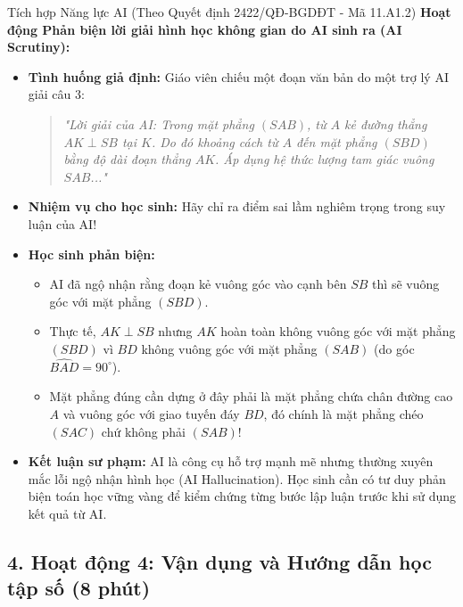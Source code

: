 \documentclass[12pt, a4paper]{article}
\begin{document}
\begin{aibox}{Tích hợp Năng lực AI (Theo Quyết định 2422/QĐ-BGDĐT - Mã 11.A1.2)}
    \textbf{Hoạt động Phản biện lời giải hình học không gian do AI sinh ra (AI Scrutiny):}
    \begin{itemize}[leftmargin=0.6cm]
        \item \textbf{Tình huống giả định:} Giáo viên chiếu một đoạn văn bản do một trợ lý AI giải câu 3:
        \begin{quote}
            \textit{"Lời giải của AI: Trong mặt phẳng $(SAB)$, từ $A$ kẻ đường thẳng $AK \perp SB$ tại $K$. Do đó khoảng cách từ $A$ đến mặt phẳng $(SBD)$ bằng độ dài đoạn thẳng $AK$. Áp dụng hệ thức lượng tam giác vuông $SAB$..."}
        \end{quote}
        \item \textbf{Nhiệm vụ cho học sinh:} Hãy chỉ ra điểm sai lầm nghiêm trọng trong suy luận của AI!
        \item \textbf{Học sinh phản biện:}
        \begin{itemize}
            \item AI đã ngộ nhận rằng đoạn kẻ vuông góc vào cạnh bên $SB$ thì sẽ vuông góc với mặt phẳng $(SBD)$.
            \item Thực tế, $AK \perp SB$ nhưng $AK$ hoàn toàn không vuông góc với mặt phẳng $(SBD)$ vì $BD$ không vuông góc với mặt phẳng $(SAB)$ (do góc $\widehat{BAD} = 90^\circ$).
            \item Mặt phẳng đúng cần dựng ở đây phải là mặt phẳng chứa chân đường cao $A$ và vuông góc với giao tuyến đáy $BD$, đó chính là mặt phẳng chéo $(SAC)$ chứ không phải $(SAB)$!
        \end{itemize}
        \item \textbf{Kết luận sư phạm:} AI là công cụ hỗ trợ mạnh mẽ nhưng thường xuyên mắc lỗi ngộ nhận hình học (AI Hallucination). Học sinh cần có tư duy phản biện toán học vững vàng để kiểm chứng từng bước lập luận trước khi sử dụng kết quả từ AI.
    \end{itemize}
\end{aibox}

\subsection*{4. Hoạt động 4: Vận dụng và Hướng dẫn học tập số (8 phút)}
\end{document}
